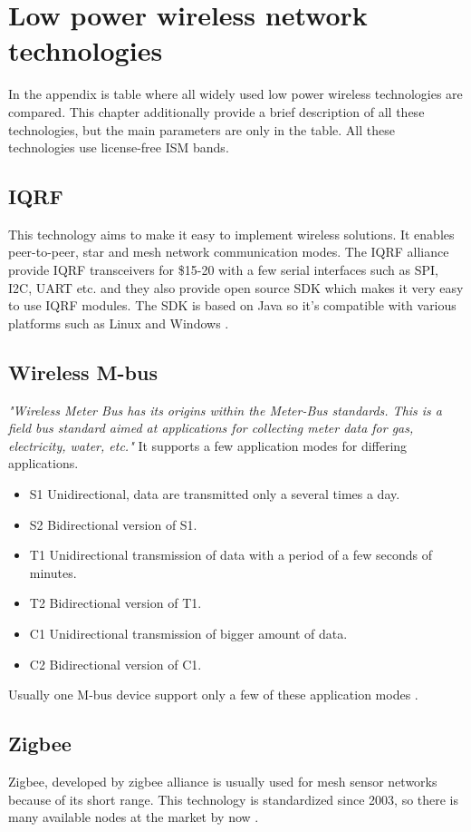 \chapter{Low power wireless network technologies}
In the appendix is table where all widely used low power wireless technologies are compared.
This chapter additionally provide a brief description of all these technologies, but the main parameters are only in the table.
All these technologies use license-free ISM bands.


\section{IQRF}
This technology aims to make it easy to implement wireless solutions. It enables peer-to-peer, star and mesh network communication modes. The IQRF alliance provide IQRF transceivers for \$15-20 with a few serial interfaces such as SPI, I2C, UART etc. and they also provide open source SDK which makes it very easy to use IQRF modules. The SDK is based on Java so it's compatible with various platforms such as Linux and Windows
\cite{1} \cite{2} \cite{3} \cite{4}.


\section{Wireless M-bus}
\textit{"Wireless Meter Bus has its origins within the Meter-Bus standards. This is a field bus standard aimed at applications for collecting meter data for gas, electricity, water, etc."} \cite{5}
It supports a few application modes for differing applications.
\begin{itemize}
  \item S1  Unidirectional, data are transmitted only a several times a day.
  \item S2	Bidirectional version of S1.
  \item	T1	Unidirectional transmission of data with a period of a few seconds of minutes.
  \item T2	Bidirectional version of T1.
  \item C1	Unidirectional transmission of bigger amount of data.
  \item C2	Bidirectional version of C1.
\end{itemize}
Usually one M-bus device support only a few of these application modes \cite{5} \cite{6} \cite{7} \cite{8}.


\section{Zigbee}
Zigbee, developed by zigbee alliance is usually used for mesh sensor networks because of its short range. This technology is standardized since 2003, so there is many available nodes at the market by now \cite{10} \cite{11} \cite{12}.

